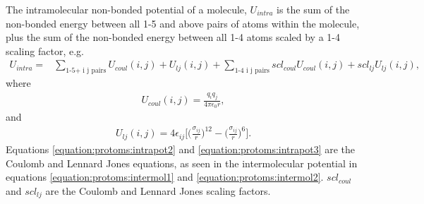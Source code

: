 \documentclass[letterpaper,10pt,english]{sphinxmanual}
\begin{document}
The intramolecular non-bonded potential of a molecule, \(U_{intra}\) is the sum of the non-bonded energy between all 1-5 and above pairs of atoms within the molecule, plus the sum of the non-bonded energy between all 1-4 atoms scaled by a 1-4 scaling factor, e.g.
\begin{equation}\label{equation:protoms:intrapot1}
\begin{split}U_{intra} = &\sum_{\text{1-5+ i j pairs}} U_{coul}(i,j) + U_{lj}(i,j) + \sum_{\text{1-4 i j pairs}} scl_{coul} U_{coul}(i,j) + scl_{lj} U_{lj}(i,j),\end{split}
\end{equation}
where
\begin{equation}\label{equation:protoms:intrapot2}
\begin{split}U_{coul}(i,j) = \frac{q_i q_j}{4\pi\epsilon_{0} r},\end{split}
\end{equation}
and
\begin{equation}\label{equation:protoms:intrapot3}
\begin{split}U_{lj}(i,j) = 4\epsilon_{ij}\biggl[ \biggl(\frac{\sigma_{ij}}{r}\biggr)^{12} - \biggl(\frac{\sigma_{ij}}{r}\biggr)^6 \biggr].\end{split}
\end{equation}
Equations \eqref{equation:protoms:intrapot2} and \eqref{equation:protoms:intrapot3} are the Coulomb and Lennard Jones equations, as seen in the intermolecular potential in equations \eqref{equation:protoms:intermol1} and \eqref{equation:protoms:intermol2}. \(scl_{coul}\) and \(scl_{lj}\) are the Coulomb and Lennard Jones scaling factors.

\ignorespaces 
{}
\end{document}
